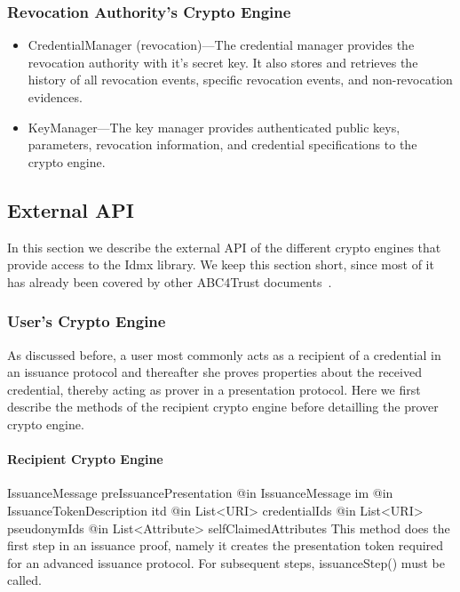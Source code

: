   \subsubsection{Revocation Authority's Crypto Engine}
  \begin{itemize}
    \item CredentialManager (revocation)---The credential manager provides the revocation authority with it's secret key. It also stores
      and retrieves the history of all revocation events, specific revocation events, and non-revocation evidences.
    \item KeyManager---The key manager provides authenticated public keys, parameters, revocation information, and credential specifications
      to the crypto engine.
  \end{itemize}


  \subsection{External API}
  \label{sec:api:interface}
  In this section we describe the external API of the different crypto engines that provide access to the Idmx library.
  We keep this section short, since most of it has already been covered by other ABC4Trust 
  documents~\cite{abc4trust:h22}.
  

  \subsubsection{User's Crypto Engine}
  
  As discussed before, a user most commonly acts as a recipient of a credential in an
  issuance protocol and thereafter she proves properties about the received credential, thereby acting
  as prover in a presentation protocol.
  Here we first describe the methods of the recipient crypto engine before detailling the prover 
  crypto engine.
  
  \paragraph{Recipient Crypto Engine}
	  \begin{method}
      {IssuanceMessage}
      {preIssuancePresentation}
      {
        {@in IssuanceMessage im}
        {@in IssuanceTokenDescription itd}
        {@in List<URI> credentialIds}
        {@in List<URI> pseudonymIds}
        {@in List<Attribute> selfClaimedAttributes}
      }
      This method does the first step in an issuance proof, namely it creates the presentation 
      token required for an advanced issuance protocol. For subsequent steps, issuanceStep() must be called.
      \end{method}
      
